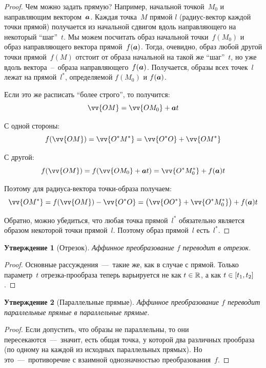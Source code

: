 \documentclass[a4paper,12pt]{article}
\newtheorem{proposition}{Утверждение}[section]
\begin{document}
  \begin{proof}
    Чем можно задать прямую?
    Например, начальной точкой~$M_0$ и направляющим вектором~$\boldsymbol a$.
    Каждая точка~$M$ прямой $l$ (радиус-вектор каждой точки прямой) получается из начальной сдвигом вдоль направляющего на некоторый ``шаг''~$t$.
    Мы можем посчитать образ начальной точки~$f(M_0)$ и образ направляющего вектора прямой~$f(\boldsymbol a)$.
    Тогда, очевидно, образ любой другой точки прямой~$f(M)$ отстоит от образа начальной на такой же ``шаг''~$t$, но уже вдоль вектора~--~образа направляющего~$f(\boldsymbol a)$.
    Получается, образы всех точек~$l$ лежат на прямой~$l^*$, определяемой $f(M_0)$ и $f(\boldsymbol a)$.
    
    Если это же расписать ``более строго'', то получится:
    \[
      \vv{OM} = \vv{OM_0} + \bds a t
    \]
    
    С одной стороны:
    \[
      f(\vv{OM}) = \vv{O^*M^*} = \vv{O^*O} + \vv{OM^*}
    \]
    
    С другой:
    \[
      f(\vv{OM}) = f(\vv{OM_0} + \bds a t) = \vv{O^*M_0^*} + f(\bds a) t
    \]
    
    Поэтому для радиуса-вектора точки-образа получаем:
    \[
      \vv{OM^*} = f(\vv{OM}) - \vv{O^*O} = \bigl(\vv{OO^*} + \vv{O^*M_0^*}\bigr) + f(\bds a) t
    \]
    
    Обратно, можно убедиться, что любая точка прямой~$l^*$ обязательно является образом некоторой точки прямой~$l$.
    Поэтому образ прямой~$l$ есть~$l^*$.
  \end{proof}
  
  
  \begin{proposition}[Отрезок]
    Аффинное преобразование $f$ переводит в отрезок.
  \end{proposition}
  
  \begin{proof}
    Основные рассуждения~---~такие же, как в случае с прямой.
    Только параметр~$t$ отрезка-прообраза теперь варьируется не как $t \hm\in \RR$, а как $t \hm\in [t_1, t_2]$.
  \end{proof}
  
  
  \begin{proposition}[Параллельные прямые]
    Аффинное преобразование $f$ переводит параллельные прямые в параллельные прямые.
  \end{proposition}
  
  \begin{proof}
    Если допустить, что образы не параллельны, то они пересекаются~---~значит, есть общая точка, у которой два различных прообраза (по одному на каждой из исходных параллельных прямых).
    Но это~---~противоречие с взаимной однозначностью преобразования~$f$.
  \end{proof}
  
\end{document}
